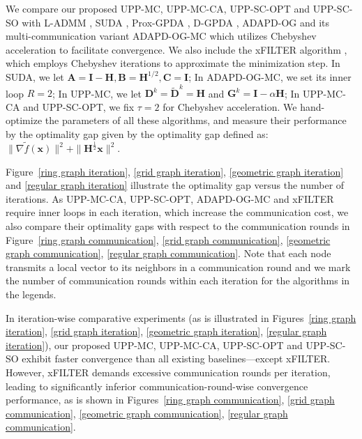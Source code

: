 \documentclass[12pt,draftcls,onecolumn]{IEEEtran}
\newcommand{\bG}{{\mathbf{G}}}
\newcommand{\bI}{{\mathbf{I}}}
\newcommand{\bH}{{\mathbf{H}}}
\newcommand{\bD}{{\mathbf{D}}}
\begin{document}
We compare our proposed UPP-MC, UPP-MC-CA, UPP-SC-OPT and UPP-SC-SO with L-ADMM \cite{yi2022sublinear}, SUDA \cite{alghunaim_unified_2022}, Prox-GPDA \cite{hong_prox-pda_2017}, D-GPDA \cite{sun2018distributed}, ADAPD-OG \cite{mancino2023decentralized} and its multi-communication variant ADAPD-OG-MC which utilizes Chebyshev acceleration to facilitate convergence. We also include the xFILTER algorithm \cite{sun_distributed_2019}, which employs Chebyshev iterations to approximate the minimization step. In SUDA, we let $\mathbf{A}=\mathbf{I}-\mathbf{H},\mathbf{B}=\mathbf{H}^{1/2},\mathbf{C}=\mathbf{I}$; In ADAPD-OG-MC, we set its inner loop $R=2$; In UPP-MC, we let $\bD^k=\tilde{\bD}^k=\mathbf{H}$ and $\bG^k=\bI-\alpha\bH$; In UPP-MC-CA and UPP-SC-OPT, we fix $\tau=2$ for Chebyshev acceleration. We hand-optimize the parameters of all these algorithms, and measure their performance by the optimality gap given by the optimality gap defined as: $\|\nabla \tilde{f}(\mathbf{x})\|^2+\|\bH^{\frac{1}{2}}\mathbf{x}\|^2.$

Figure~\ref{ring graph iteration}, \ref{grid graph iteration}, \ref{geometric graph iteration} and \ref{regular graph iteration} illustrate the optimality gap versus the number of iterations. As UPP-MC-CA, UPP-SC-OPT, ADAPD-OG-MC and xFILTER require inner loops in each iteration, which increase the communication cost, we also compare their optimality gaps with respect to the communication rounds in Figure~\ref{ring graph communication}, \ref{grid graph communication}, \ref{geometric graph communication}, \ref{regular graph communication}. Note that each node transmits a local vector to its neighbors in a communication round and we mark the number of communication rounds within each iteration for the algorithms in the legends. 

In iteration-wise comparative experiments (as is illustrated in Figures~\ref{ring graph iteration}, \ref{grid graph iteration}, \ref{geometric graph iteration}, \ref{regular graph iteration}), our proposed UPP-MC, UPP-MC-CA, UPP-SC-OPT and UPP-SC-SO exhibit faster convergence than all existing baselines—except xFILTER. However, xFILTER demands excessive communication rounds per iteration, leading to significantly inferior communication-round-wise convergence performance, as is shown in Figures~\ref{ring graph communication}, \ref{grid graph communication}, \ref{geometric graph communication}, \ref{regular graph communication}. 
\end{document}
